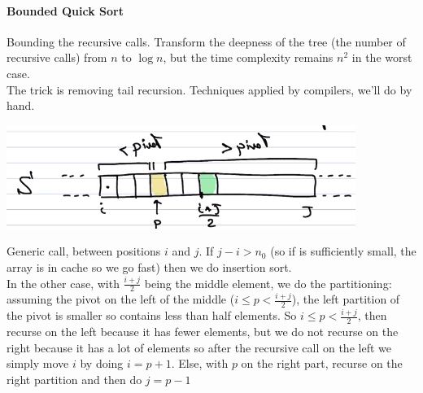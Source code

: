 \documentclass[10pt]{report}
\begin{document}
\paragraph{Bounded Quick Sort} Bounding the recursive calls. Transform the deepness of the tree (the number of recursive calls) from $n$ to $\log n$, but the time complexity remains $n^2$ in the worst case.\\
The trick is removing tail recursion. Techniques applied by compilers, we'll do by hand.\\
\begin{center}
	\includegraphics[scale=1]{8.png}
\end{center}
Generic call, between positions $i$ and $j$. If $j - i > n_0$ (so if is sufficiently small, the array is in cache so we go fast) then we do insertion sort.\\
In the other case, with $\frac{i+j}{2}$ being the middle element, we do the partitioning: assuming the pivot on the left of the middle ($i \leq p < \frac{i+j}{2}$), the left partition of the pivot is smaller so contains less than half elements. So $i \leq p < \frac{i+j}{2}$, then recurse on the left because it has fewer elements, but we do not recurse on the right because it has a lot of elements so after the recursive call on the left we simply move $i$ by doing $i = p + 1$. Else, with $p$ on the right part, recurse on the right partition and then do $j = p-1$
\end{document}
